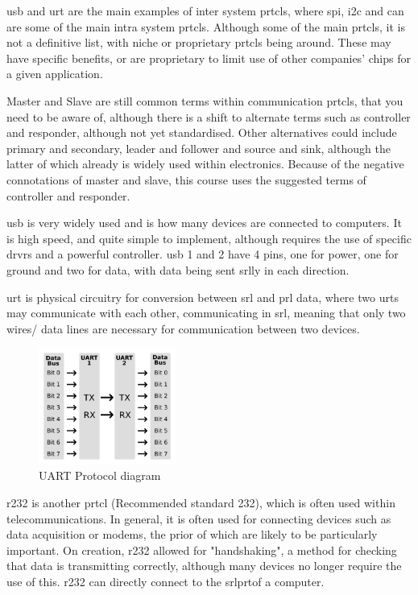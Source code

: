 \documentclass[a4paper,11pt]{report}
\begin{document}
\gls{usb} and \gls{urt} are the main examples of inter system \gls{prtcl}s, where \gls{spi}, \gls{i2c} and \gls{can} are some of the main intra system \gls{prtcl}s. Although some of the main \gls{prtcl}s, it is not a definitive list, with niche or proprietary \gls{prtcl}s being around. These may have specific benefits, or are proprietary to limit use of other companies' chips for a given application.

Master and Slave are still common terms within communication \gls{prtcl}s, that you need to be aware of, although there is a shift to alternate terms such as controller and responder, although not yet standardised. Other alternatives could include primary and secondary, leader and follower and source and sink, although the latter of which already is widely used within electronics. Because of the negative connotations of master and slave, this course uses the suggested terms of controller and responder.

\gls{usb} is very widely used and is how many devices are connected to computers. It is high speed, and quite simple to implement, although requires the use of specific \gls{drvr}s and a powerful controller. \gls{usb} 1 and 2 have 4 pins, one for power, one for ground and two for data, with data being sent \gls{srl}ly in each direction.

\gls{urt} is physical circuitry for conversion between \gls{srl} and \gls{prl} data, where two \gls{urt}s may communicate with each other, communicating in \gls{srl}, meaning that only two wires/ data lines are necessary for communication between two devices.

\begin{figure}[H]
\centering
\includegraphics[width=0.4\textwidth]{UART}
\caption{UART Protocol diagram}
\end{figure}

\gls{r232} is another \gls{prtcl} (Recommended standard 232), which is often used within telecommunications. In general, it is often used for connecting devices such as data acquisition or modems, the prior of which are likely to be particularly important. On creation, \gls{r232} allowed for "handshaking", a method for checking that data is transmitting correctly, although many devices no longer require the use of this. \gls{r232} can directly connect to the \gls{srl}\gls{prt}of a computer.
\end{document}
